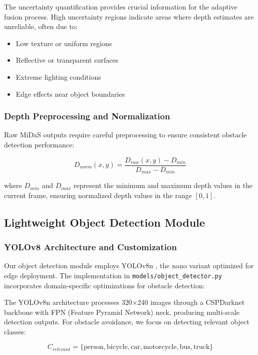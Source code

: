 \documentclass[10pt]{article}
\begin{document}
The uncertainty quantification provides crucial information for the adaptive fusion process. High uncertainty regions indicate areas where depth estimates are unreliable, often due to:
\begin{itemize}
\item Low texture or uniform regions
\item Reflective or transparent surfaces
\item Extreme lighting conditions
\item Edge effects near object boundaries
\end{itemize}

\subsubsection{Depth Preprocessing and Normalization}

Raw MiDaS outputs require careful preprocessing to ensure consistent obstacle detection performance:

\begin{equation}
D_{norm}(x,y) = \frac{D_{raw}(x,y) - D_{min}}{D_{max} - D_{min}}
\label{eq:depth_normalization}
\end{equation}

where $D_{min}$ and $D_{max}$ represent the minimum and maximum depth values in the current frame, ensuring normalized depth values in the range $[0,1]$.

\subsection{Lightweight Object Detection Module}

\subsubsection{YOLOv8 Architecture and Customization}

Our object detection module employs YOLOv8n \cite{jocher2023ultralytics}, the nano variant optimized for edge deployment. The implementation in \texttt{models/object\_detector.py} incorporates domain-specific optimizations for obstacle detection:

The YOLOv8n architecture processes 320$\times$240 images through a CSPDarknet backbone with FPN (Feature Pyramid Network) neck, producing multi-scale detection outputs. For obstacle avoidance, we focus on detecting relevant object classes:

\begin{equation}
C_{relevant} = \{\text{person}, \text{bicycle}, \text{car}, \text{motorcycle}, \text{bus}, \text{truck}\}
\label{eq:relevant_classes}
\end{equation}
\end{document}
